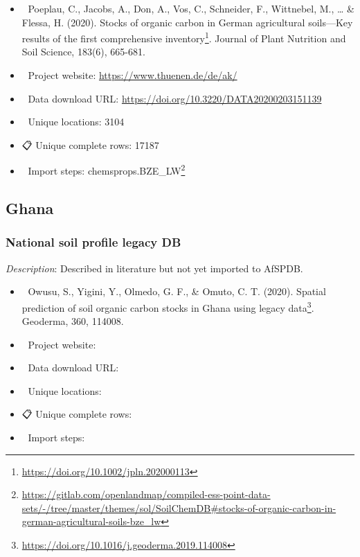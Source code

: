 \documentclass[
  graybox,natbib,nospthms]{svmono}
\providecommand{\tightlist}{%
  \setlength{\itemsep}{0pt}\setlength{\parskip}{0pt}}
\providecommand{\tightlist}{\setlength{\itemsep}{0pt}\setlength{\parskip}{0pt}}
\renewcommand{\href}[2]{#2 (\url{#1})}
\renewcommand{\href}[2]{#2\footnote{\url{#1}}}
\begin{document}
\begin{itemize}
\tightlist
\item
  📕 Poeplau, C., Jacobs, A., Don, A., Vos, C., Schneider, F., Wittnebel, M., \ldots{} \& Flessa, H. (2020). \href{https://doi.org/10.1002/jpln.202000113}{Stocks of organic carbon in German agricultural soils---Key results of the first comprehensive inventory}. Journal of Plant Nutrition and Soil Science, 183(6), 665-681.\\
\item
  🔗 Project website: \url{https://www.thuenen.de/de/ak/}\\
\item
  📂 Data download URL: \url{https://doi.org/10.3220/DATA20200203151139}\\
\item
  📍 Unique locations: 3104\\
\item
  📋 Unique complete rows: 17187\\
\item
  📝 Import steps: \href{https://gitlab.com/openlandmap/compiled-ess-point-data-sets/-/tree/master/themes/sol/SoilChemDB\#stocks-of-organic-carbon-in-german-agricultural-soils-bze_lw}{chemsprops.BZE\_LW}
\end{itemize}

\hypertarget{ghana}{%
\subsection{Ghana}\label{ghana}}

\hypertarget{national-soil-profile-legacy-db}{%
\subsubsection{National soil profile legacy DB}\label{national-soil-profile-legacy-db}}

\emph{Description}: Described in literature but not yet imported to AfSPDB.

\begin{itemize}
\tightlist
\item
  📕 Owusu, S., Yigini, Y., Olmedo, G. F., \& Omuto, C. T. (2020). \href{https://doi.org/10.1016/j.geoderma.2019.114008}{Spatial prediction of soil organic carbon stocks in Ghana using legacy data}. Geoderma, 360, 114008.\\
\item
  🔗 Project website:\\
\item
  📂 Data download URL:\\
\item
  📍 Unique locations:\\
\item
  📋 Unique complete rows:\\
\item
  📝 Import steps:
\end{itemize}
\end{document}
